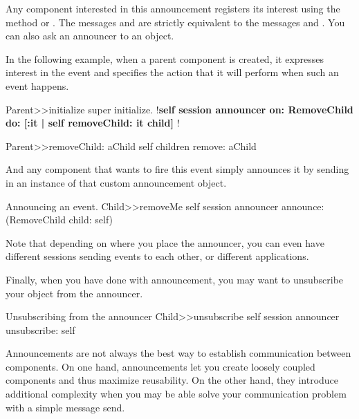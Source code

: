 \documentclass[a4paper,10pt,twoside]{book}
\begin{document}
Any component interested in this announcement registers its interest
using the method 
or .  The messages
 and  are strictly equivalent to the
messages   and
. You can also ask an announcer to
 an object.

In the following example, when a parent component is created, it
expresses interest in the  event and specifies the
action that it will perform when such an event happens.

\begin{method}{}
Parent>>initialize
    super initialize.
    !\textbf{self session announcer on: RemoveChild do: [:it | self removeChild: it child] }!

Parent>>removeChild: aChild
    self children remove: aChild
\end{method}

And any component that wants to fire this event simply announces it by
sending in an instance of that custom announcement object.

\begin{method}{Announcing an event.}
Child>>removeMe
    self session announcer announce: (RemoveChild child: self)
\end{method}

Note that depending on where you place the announcer, you can even
have different sessions sending events to each other, or different
applications.


Finally, when you have done with announcement, you may want to unsubscribe your object from the announcer.

\begin{method}{Unsubscribing from the announcer}
Child>>unsubscribe
    self session announcer unsubscribe: self
\end{method}


Announcements are not always the best way to establish communication
between components.  On one hand, announcements let you create loosely
coupled components and thus maximize reusability.  On the other hand,
they introduce additional complexity when you may be able solve your
communication problem with a simple message send.
\end{document}
